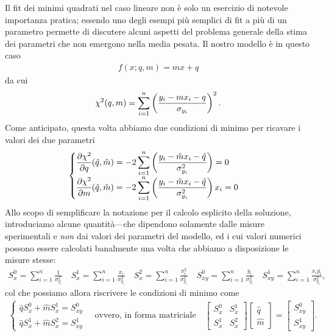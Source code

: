 Il fit dei minimi quadrati nel caso lineare non è solo un esercizio di
notevole importanza pratica; essendo uno degli esempi più semplici di fit a
più di un parametro permette di discutere alcuni aspetti del problema
generale della stima dei parametri che non emergono nella media pesata.
Il nostro modello è in questo caso
\begin{align*}
  f(x; q, m) = mx + q
\end{align*}
da cui
\begin{align*}
  \chisquare{q, m} =
  \sum_{i = 1}^{n}\left(\frac{y_i - mx_i - q}{\sigma_{y_i}}\right)^2.
\end{align*}
Come anticipato, questa volta abbiamo due condizioni di minimo per ricavare
i valori dei due parametri
\begin{align}\label{eq:min_chisq_lineare}
  \begin{cases}
    \displaystyle
    \pd{\chisq}{q}{\hat{q}, \hat{m}} = - 2\sum_{i = 1}^{n}\left(
    \frac{y_i - \hat{m}x_i - \hat{q}}{\sigma_{y_i}^2}\right) = 0\\
    \displaystyle
    \pd{\chisq}{m}{\hat{q}, \hat{m}} = - 2\sum_{i = 1}^{n}\left(
    \frac{y_i - \hat{m}x_i - \hat{q}}{\sigma_{y_i}^2}\right)x_i = 0
  \end{cases}
\end{align}
Allo scopo di semplificare la notazione per il calcolo esplicito della
soluzione, introduciamo alcune quantità---che dipendono solamente dalle misure
sperimentali e \emph{non} dai valori dei parametri del modello, ed i cui valori
numerici possono essere calcolati banalmente una volta che abbiamo a
disposizione le misure stesse:
\begin{align}
  S_x^0 = \sum_{i = 1}^{n} \frac{1}{\sigma_{y_i}^2} \quad
  S_x^1 = \sum_{i = 1}^{n} \frac{x_i}{\sigma_{y_i}^2} \quad
  S_x^2 = \sum_{i = 1}^{n} \frac{x_i^2}{\sigma_{y_i}^2} \quad
  S_{xy}^0 = \sum_{i = 1}^{n} \frac{y_i}{\sigma_{y_i}^2} \quad
  S_{xy}^1 = \sum_{i = 1}^{n} \frac{x_iy_i}{\sigma_{y_i}^2},
\end{align}
col che possiamo allora riscrivere le condizioni di minimo come
\begin{align*}
  \begin{cases}
    \hat{q}S_x^0 + \hat{m}S_x^1 = S_{xy}^0\\
    \hat{q}S_x^1  + \hat{m}S_x^2 = S_{xy}^1
  \end{cases} \quad \text{ovvero, in forma matriciale} \quad
  \begin{bmatrix}
    S_x^0 & S_x^1\\
    S_x^1 & S_x^2
  \end{bmatrix}
  \begin{bmatrix}
    \hat{q}\\
    \hat{m}
  \end{bmatrix} =
  \begin{bmatrix}
    S_{xy}^0\\
    S_{xy}^1
  \end{bmatrix}.
\end{align*}
